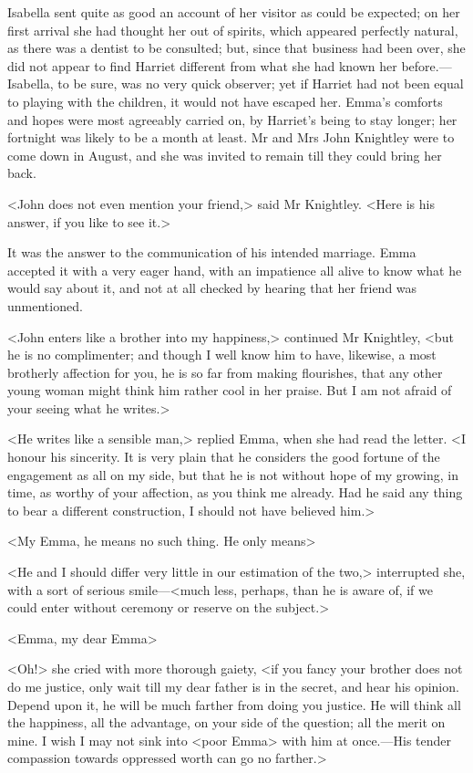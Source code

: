 Isabella sent quite as good an account of her visitor as could be expected; on her first arrival she had thought her out of spirits, which appeared perfectly natural, as there was a dentist to be consulted; but, since that business had been over, she did not appear to find Harriet different from what she had known her before.—Isabella, to be sure, was no very quick observer; yet if Harriet had not been equal to playing with the children, it would not have escaped her. Emma's comforts and hopes were most agreeably carried on, by Harriet's being to stay longer; her fortnight was likely to be a month at least. Mr and Mrs John Knightley were to come down in August, and she was invited to remain till they could bring her back.

<John does not even mention your friend,> said Mr Knightley. <Here is his answer, if you like to see it.>

It was the answer to the communication of his intended marriage. Emma accepted it with a very eager hand, with an impatience all alive to know what he would say about it, and not at all checked by hearing that her friend was unmentioned.

<John enters like a brother into my happiness,> continued Mr Knightley, <but he is no complimenter; and though I well know him to have, likewise, a most brotherly affection for you, he is so far from making flourishes, that any other young woman might think him rather cool in her praise. But I am not afraid of your seeing what he writes.>

<He writes like a sensible man,> replied Emma, when she had read the letter. <I honour his sincerity. It is very plain that he considers the good fortune of the engagement as all on my side, but that he is not without hope of my growing, in time, as worthy of your affection, as you think me already. Had he said any thing to bear a different construction, I should not have believed him.>

<My Emma, he means no such thing. He only means\longdash>

<He and I should differ very little in our estimation of the two,> interrupted she, with a sort of serious smile—<much less, perhaps, than he is aware of, if we could enter without ceremony or reserve on the subject.>

<Emma, my dear Emma\longdash>

<Oh!> she cried with more thorough gaiety, <if you fancy your brother does not do me justice, only wait till my dear father is in the secret, and hear his opinion. Depend upon it, he will be much farther from doing you justice. He will think all the happiness, all the advantage, on your side of the question; all the merit on mine. I wish I may not sink into <poor Emma> with him at once.—His tender compassion towards oppressed worth can go no farther.>

